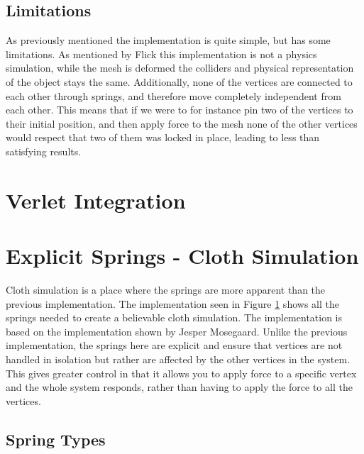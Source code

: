 \subsection{Limitations}
As previously mentioned the implementation is quite simple, but has some limitations. 
As mentioned by Flick\cite{catlike_mesh_deformation} this implementation is not a physics simulation, while the mesh is deformed
the colliders and physical representation of the object stays the same.
Additionally, none of the vertices are connected to each other through springs, and therefore move completely independent from each other. 
This means that if we were to for instance pin two of the vertices to their initial position, and then apply force to the mesh
none of the other vertices would respect that two of them was locked in place, leading to less than satisfying results.

\section{Verlet Integration}

\section{Explicit Springs - Cloth Simulation}
Cloth simulation is a place where the springs are more apparent than the previous implementation.
The implementation seen in Figure \ref{fig:my_cloth_implementation_springs} shows all the springs needed to create a believable cloth simulation.
The implementation is based on the implementation shown by Jesper Mosegaard\cite{mosegaards_clothing_simulation}.
Unlike the previous implementation, the springs here are explicit and ensure that vertices are not handled in isolation but rather are affected by the other vertices in the system.
This gives greater control in that it allows you to apply force to a specific vertex and the whole system responds, rather than having to apply the force to all the vertices.



\begin{figure}
    \caption{}
    \label{fig:my_cloth_implementation_springs}
\end{figure}


\subsection{Spring Types}
